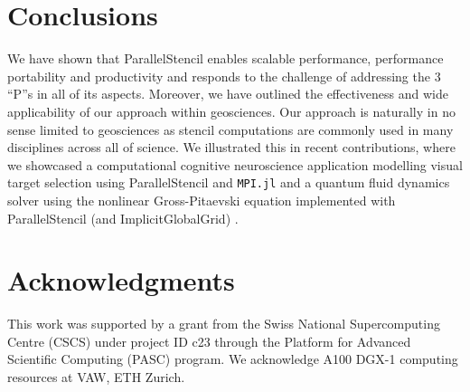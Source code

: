\documentclass{juliacon}
\begin{document}
\section{Conclusions}
We have shown that ParallelStencil enables scalable performance, performance portability and productivity and responds to the challenge of addressing the 3 ``P''s in all of its aspects. Moreover, we have outlined the effectiveness and wide applicability of our approach within geosciences. Our approach is naturally in no sense limited to geosciences as stencil computations are commonly used in many disciplines across all of science. We illustrated this in recent contributions, where we showcased a computational cognitive neuroscience application modelling visual target selection using ParallelStencil and \texttt{MPI.jl} \cite{pasc22} and a quantum fluid dynamics solver using the nonlinear Gross-Pitaevski equation implemented with ParallelStencil (and ImplicitGlobalGrid) \cite{pasc21}.

\section{Acknowledgments}
 This work was supported by a grant from the Swiss National Supercomputing Centre (CSCS) under project ID c23 through the Platform for Advanced Scientific Computing (PASC) program. We acknowledge A100 DGX-1 computing resources at VAW, ETH Zurich.



\end{document}
